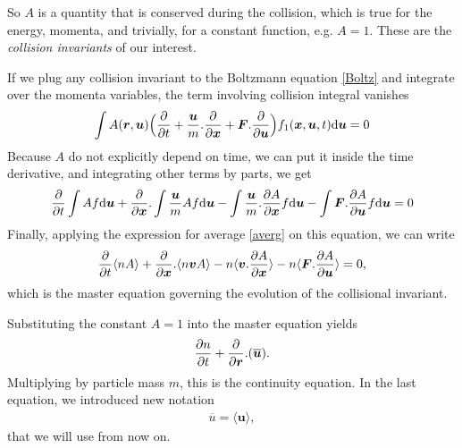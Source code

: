 So $A$ is a quantity that is conserved during the collision, which is true for the energy, momenta, and trivially, for a constant function, e.g. $A=1$.
These are the \textit{collision invariants} of our interest.

If we plug any collision invariant to the Boltzmann equation \ref{Boltz} and integrate over the momenta variables, the term involving collision integral vanishes
\begin{align*}
\int A(\bm{r},\bm{u}) \Big( \frac{\partial }{\partial t} + \frac{\bm{u}}{m}.\frac{\partial}{\partial \bm{x}} + \bm{F}.\frac{\partial}{\partial \bm{u}} \Big) f_1(\bm{x},\bm{u},t) \mathrm{d} \bm{u} = 0
\end{align*} 
Because $A$ do not explicitly depend on time, we can put it inside the time derivative, and integrating other terms by parts, we get
\begin{align*}
\frac{\partial}{\partial t} \int A f \mathrm{d}\bm{u} + \frac{\partial}{\partial \bm{x}} . \int \frac{\bm{u}}{m} A f \mathrm{d} \bm{u} - \int \frac{\bm{u}}{m} . \frac{\partial A}{\partial \bm{x}} f \mathrm{d} \bm{u} - \int \bm{F} . \frac{\partial A}{\partial \bm{u}}f \mathrm{d} \bm{u} = 0
\end{align*}
Finally, applying the expression for average \ref{averg} on this equation, we can write
\begin{align} \label{master}
\frac{\partial}{\partial t} \langle n A \rangle + \frac{\partial}{\partial \bm{x}}.\langle n \bm{v} A \rangle - n \langle\bm{v} .\frac{\partial A}{\partial \bm{x}} \rangle - n \langle \bm{F}. \frac{\partial A}{\partial \bm{u}} \rangle = 0,
\end{align}
which is the master equation governing the evolution of the collisional invariant.

Substituting the constant $A=1$ into the master equation yields
\begin{align*}
\frac{\partial n}{\partial t} + \frac{\partial}{\partial \bm{r}}.(\overline{\bm{u}}). 
\end{align*}
Multiplying by particle mass $m$, this is the continuity equation.
In the last equation, we introduced new notation 
\begin{align*}
\overline{{u}} = \langle \bm{u} \rangle,
\end{align*}
that we will use from now on.

